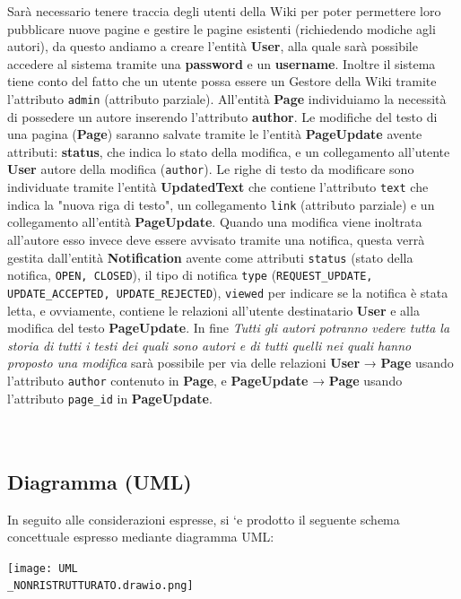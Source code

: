 \documentclass{article}
\begin{document}
	Sarà necessario tenere traccia degli utenti della Wiki per poter permettere loro pubblicare nuove pagine e gestire le pagine esistenti (richiedendo modiche agli autori), da questo andiamo a creare l'entità \textbf{User}, alla quale sarà possibile accedere al sistema tramite una \textbf{password} e un \textbf{username}. Inoltre il sistema tiene conto del fatto che un utente possa essere un Gestore della Wiki tramite l'attributo \texttt{admin} (attributo parziale).
	All'entità \textbf{Page} individuiamo la necessità di possedere un autore inserendo l'attributo \textbf{author}. Le modifiche del testo di una pagina (\textbf {Page}) saranno salvate tramite le l'entità \textbf {PageUpdate} avente attributi: \textbf{status}, che indica lo stato della modifica, e un collegamento all'utente \textbf{User} autore della modifica (\texttt {author}). Le righe di testo da modificare sono individuate tramite l'entità \textbf {UpdatedText} che contiene l'attributo \texttt{text} che indica la "nuova riga di testo", un collegamento \texttt{link} (attributo parziale) e un collegamento all'entità \textbf{PageUpdate}.
	Quando una modifica viene inoltrata all'autore esso invece deve essere avvisato tramite una notifica, questa verrà gestita dall'entità \textbf{Notification} avente come attributi \texttt{status} (stato della notifica, \texttt{OPEN, CLOSED}), il tipo di notifica \texttt{type} (\texttt{REQUEST\_UPDATE, UPDATE\_ACCEPTED, UPDATE\_REJECTED}), \texttt{viewed} per indicare se la notifica è stata letta, e ovviamente, contiene le relazioni all'utente destinatario \textbf{User} e alla modifica del testo \textbf{PageUpdate}. 
	In fine \textit{Tutti gli autori potranno vedere tutta la storia di tutti i testi dei quali sono autori e di tutti quelli nei quali hanno proposto una modifica} sarà possibile per via delle relazioni \textbf{User} → \textbf{Page} usando l'attributo \texttt{author} contenuto in \textbf{Page}, e \textbf{PageUpdate} → \textbf{Page} usando l'attributo \texttt{page\_id} in \textbf{PageUpdate}.
	\\\\\\
	
	{\subsection{Diagramma (UML)}}
	 In seguito alle considerazioni espresse, si `e prodotto
	 il seguente schema concettuale espresso mediante diagramma UML:
	 
	\begin{center}
	\texttt{[image: UML\\\_NONRISTRUTTURATO.drawio.png]}
	\end{center}
	 
\end{document}
